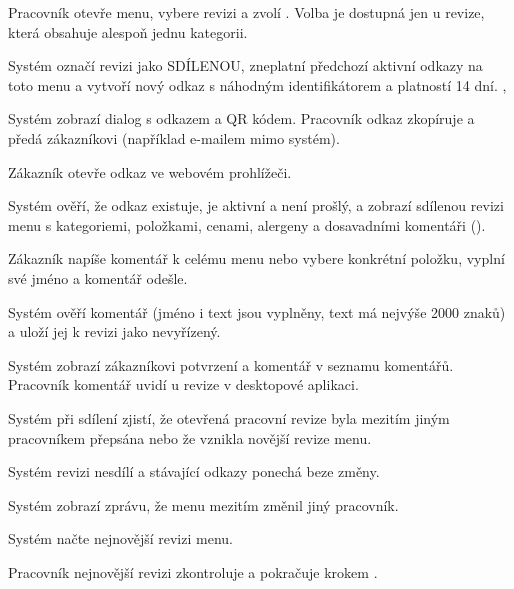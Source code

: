 \begin{ucsteps}
  \item \label{uc:11:1}Pracovník otevře menu, vybere revizi a zvolí . Volba je dostupná jen u revize, která obsahuje alespoň jednu kategorii.
  \item \label{uc:11:2}Systém označí revizi jako SDÍLENOU, zneplatní předchozí aktivní odkazy na toto menu a vytvoří nový odkaz s náhodným identifikátorem a platností 14 dní. , 
  \item \label{uc:11:3}Systém zobrazí dialog s odkazem a QR kódem. Pracovník odkaz zkopíruje a předá zákazníkovi (například e-mailem mimo systém).
  \item \label{uc:11:4}Zákazník otevře odkaz ve webovém prohlížeči.
  \item \label{uc:11:5}Systém ověří, že odkaz existuje, je aktivní a není prošlý, a zobrazí sdílenou revizi menu s kategoriemi, položkami, cenami, alergeny a dosavadními komentáři (). 
  \item \label{uc:11:6}Zákazník napíše komentář k celému menu nebo vybere konkrétní položku, vyplní své jméno a komentář odešle.
  \item \label{uc:11:7}Systém ověří komentář (jméno i text jsou vyplněny, text má nejvýše 2000 znaků) a uloží jej k revizi jako nevyřízený. 
  \item \label{uc:11:8}Systém zobrazí zákazníkovi potvrzení a komentář v seznamu komentářů. Pracovník komentář uvidí u revize v desktopové aplikaci.
\end{ucsteps}

\begin{ucalt}
  \item[2.1]\label{uc:11:2.1} Systém při sdílení zjistí, že otevřená pracovní revize byla mezitím jiným pracovníkem přepsána nebo že vznikla novější revize menu.
  \item[2.2]\label{uc:11:2.2} Systém revizi nesdílí a stávající odkazy ponechá beze změny.
  \item[2.3]\label{uc:11:2.3} Systém zobrazí zprávu, že menu mezitím změnil jiný pracovník.
  \item[2.4]\label{uc:11:2.4} Systém načte nejnovější revizi menu.
  \item[2.5]\label{uc:11:2.5} Pracovník nejnovější revizi zkontroluje a pokračuje krokem .
\end{ucalt}

